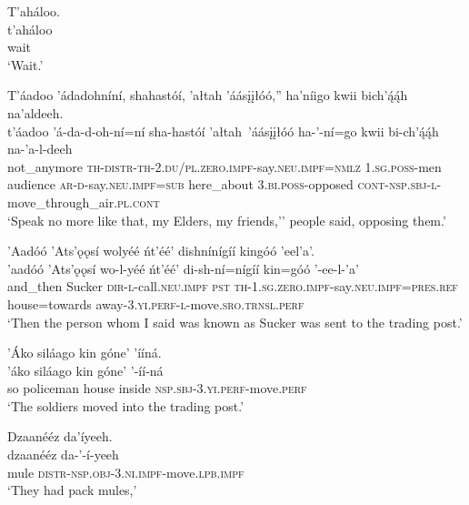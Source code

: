 \ea\label{ex:text1-49-2}
T’aháloo.\\
\gll t’aháloo\\
     wait\\
\glt `Wait.'
\z

\ea\label{ex:text1-49-3}
T’áadoo ’ádadohníní, shahastóí, ’ałtah ’áásįįłóó,'' ha’níigo kwii bich’ą́ą́h na’aldeeh.\\
\gll t’áadoo	’á-da-d-oh-ní=ní	sha-hastóí	’ałtah~{’áásįįłóó}	ha-’-ní=go	kwii	bi-ch’ą́ą́h	na-’a-l-deeh\\
     not\_anymore	\textsc{th}-\textsc{distr}-\textsc{th}-2.\textsc{du}/\textsc{pl}.\textsc{zero}.\textsc{impf}-say.\textsc{neu}.\textsc{impf}=\textsc{nmlz}	1.\textsc{sg}.\textsc{poss}-men	audience	\textsc{ar}-\textsc{d}-say.\textsc{neu}.\textsc{impf}=\textsc{sub}	here\_about	3.\textsc{bi}.\textsc{poss}-opposed	\textsc{cont}-\textsc{nsp}.\textsc{sbj}-\textsc{l}-move\_through\_air.\textsc{pl}.\textsc{cont}\\
\glt `Speak no more like that, my Elders, my friends,'' people said, opposing them.'
\z

\ea\label{ex:text1-50-1}
’Aadóó ’Ats’ǫǫsí wolyéé ńt’éé’ dishnínígíí kingóó ’eel’a’.\\
\gll ’aadóó	’Ats’ǫǫsí	wo-l-yéé	ńt’éé’	di-sh-ní=nígíí	kin=góó	’-ee-l-’a’\\
     and\_then	Sucker	\textsc{dir}-\textsc{l}-call.\textsc{neu}.\textsc{impf}	\textsc{pst}	\textsc{th}-1.\textsc{sg}.\textsc{zero}.\textsc{impf}-say.\textsc{neu}.\textsc{impf}=\textsc{pres}.\textsc{ref}	house=towards	away-3.\textsc{yi}.\textsc{perf}-\textsc{l}-move.\textsc{sro}.\textsc{trnsl}.\textsc{perf}\\
\glt `Then the person whom I said was known as Sucker was sent to the trading post.'
\z

\ea\label{ex:text1-50-2}
’Áko siláago kin góne’ ’ííná.\\
\gll ’áko	siláago	kin	góne’	’-íí-ná\\
     so	policeman	house	inside	\textsc{nsp}.\textsc{sbj}-3.\textsc{yi}.\textsc{perf}-move.\textsc{perf}\\
\glt `The soldiers moved into the trading post.'
\z

\ea\label{ex:text1-50-3}
Dzaanééz da’íyeeh.\\
\gll dzaanééz	da-’-í-yeeh\\
     mule	\textsc{distr}-\textsc{nsp}.\textsc{obj}-3.\textsc{ni}.\textsc{impf}-move.\textsc{lpb}.\textsc{impf}\\
\glt `They had pack mules,'
\z

